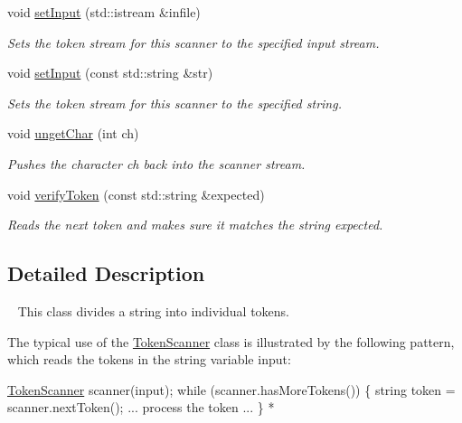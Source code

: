 \begin{DoxyCompactItemize}
void \mbox{\hyperlink{classTokenScanner_adb06e967f852573750bd97c5a76c790c}{set\+Input}} (std\+::istream \&infile)
\begin{DoxyCompactList}\small\item\em Sets the token stream for this scanner to the specified input stream. \end{DoxyCompactList}\item 
void \mbox{\hyperlink{classTokenScanner_a3c337c514c15a062c8e3dd04e0e9a824}{set\+Input}} (const std\+::string \&str)
\begin{DoxyCompactList}\small\item\em Sets the token stream for this scanner to the specified string. \end{DoxyCompactList}\item 
void \mbox{\hyperlink{classTokenScanner_a44b49340cfed6b94e9f625c9f2f73fbf}{unget\+Char}} (int ch)
\begin{DoxyCompactList}\small\item\em Pushes the character {\ttfamily ch} back into the scanner stream. \end{DoxyCompactList}\item 
void \mbox{\hyperlink{classTokenScanner_ad7ae526d42faff3aca1c860f302cbb76}{verify\+Token}} (const std\+::string \&expected)
\begin{DoxyCompactList}\small\item\em Reads the next token and makes sure it matches the string {\ttfamily expected}. \end{DoxyCompactList}\end{DoxyCompactItemize}


\subsection{Detailed Description}
~\newline
 This class divides a string into individual tokens. 

The typical use of the {\ttfamily \mbox{\hyperlink{classTokenScanner}{Token\+Scanner}}} class is illustrated by the following pattern, which reads the tokens in the string variable {\ttfamily input}\+:


\begin{DoxyPre}
     \mbox{\hyperlink{classTokenScanner}{TokenScanner}} scanner(input);
     while (scanner.hasMoreTokens()) \{
        string token = scanner.nextToken();
        ... process the token ...
     \}
*\end{DoxyPre}


